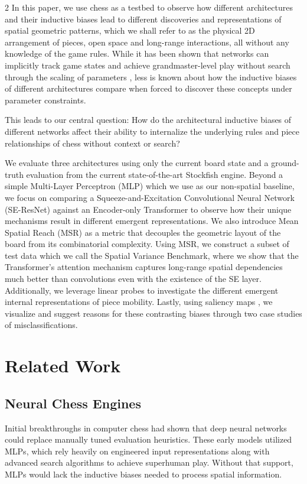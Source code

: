 \documentclass[a4paper,10pt]{article}
\begin{document}
\begin{multicols*}{2}
In this paper, we use chess as a testbed to observe how different architectures and their inductive biases lead to different discoveries and representations of spatial geometric patterns, which we shall refer to as the physical 2D arrangement of pieces, open space and long-range interactions, all without any knowledge of the game rules. While it has been shown that networks can implicitly track game states \cite{li2022emergent} and achieve grandmaster-level play without search through the scaling of parameters \cite{ruoss2024grandmaster}, less is known about how the inductive biases of different architectures compare when forced to discover these concepts under parameter constraints.

This leads to our central question: How do the architectural inductive biases of different networks affect their ability to internalize the underlying rules and piece relationships of chess without context or search?

We evaluate three architectures using only the current board state and a ground-truth evaluation from the current state-of-the-art Stockfish engine. Beyond a simple Multi-Layer Perceptron (MLP) which we use as our non-spatial baseline, we focus on comparing a Squeeze-and-Excitation Convolutional Neural Network (SE-ResNet) \cite{he2016deep, hu2018squeeze} against an Encoder-only Transformer \cite{vaswani2017attention} to observe how their unique mechanisms result in different emergent representations. We also introduce Mean Spatial Reach (MSR) as a metric that decouples the geometric layout of the board from its combinatorial complexity. Using MSR, we construct a subset of test data which we call the Spatial Variance Benchmark, where we show that the Transformer's attention mechanism captures long-range spatial dependencies much better than convolutions even with the existence of the SE layer. Additionally, we leverage linear probes \cite{alain2016understanding} to investigate the different emergent internal representations of piece mobility. Lastly, using saliency maps \cite{simonyan2013deep}, we visualize and suggest reasons for these contrasting biases through two case studies of misclassifications. 

\section{Related Work}
\subsection{Neural Chess Engines}
Initial breakthroughs in computer chess \cite{lai2015giraffe, david2016deepchess} had shown that deep neural networks could replace manually tuned evaluation heuristics. These early models utilized MLPs, which rely heavily on engineered input representations along with advanced search algorithms to achieve superhuman play. Without that support, MLPs would lack the inductive biases needed to process spatial information. 


\end{multicols*}
\end{document}
